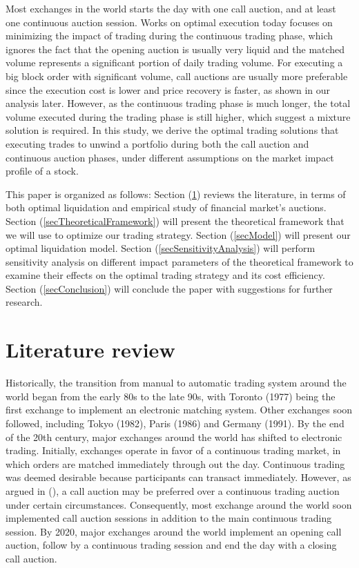 \documentclass{article}
\begin{document}
Most exchanges in the world starts the day with one call auction, and at least one continuous auction session. Works on optimal execution today focuses on minimizing the impact of trading during the continuous trading phase, which ignores the fact that the opening auction is usually very liquid and the matched volume represents a significant portion of daily trading volume. For executing a big block order with significant volume, call auctions are usually more preferable since the execution cost is lower and price recovery is faster, as shown in our analysis later. However, as the continuous trading phase is much longer, the total volume executed during the trading phase is still higher, which suggest a mixture solution is required. In this study, we derive the optimal trading solutions that executing trades to unwind a portfolio during both the call auction and continuous auction phases, under different assumptions on the market impact profile of a stock.

This paper is organized as follows: Section (\ref{secReview}) reviews the literature, in terms of both optimal liquidation and empirical study of financial market's auctions. Section (\ref{secTheoreticalFramework}) will present the theoretical framework that we will use to optimize our trading strategy. Section (\ref{secModel}) will present our optimal liquidation model. Section (\ref{secSensitivityAnalysis}) will perform sensitivity analysis on different impact parameters of the theoretical framework to examine their effects on the optimal trading strategy and its cost efficiency. Section (\ref{secConclusion}) will conclude the paper with suggestions for further research.

\section{Literature review}\label{secReview}
Historically, the transition from manual to automatic trading system around the world began from the early 80s to the late 90s, with Toronto (1977) being the first exchange to implement an electronic matching system. Other exchanges soon followed, including Tokyo (1982), Paris (1986) and Germany (1991). By the end of the 20th century, major exchanges around the world has shifted to electronic trading. Initially, exchanges operate in favor of a continuous trading market, in which orders are matched immediately through out the day. Continuous trading was deemed desirable because participants can transact immediately. However, as argued in (\cite{Economides1995}), a call auction may be preferred over a continuous trading auction under certain circumstances. Consequently, most exchange around the world soon implemented call auction sessions in addition to the main continuous trading session. By 2020, major exchanges around the world implement an opening call auction, follow by a continuous trading session and end the day with a closing call auction.
\end{document}
